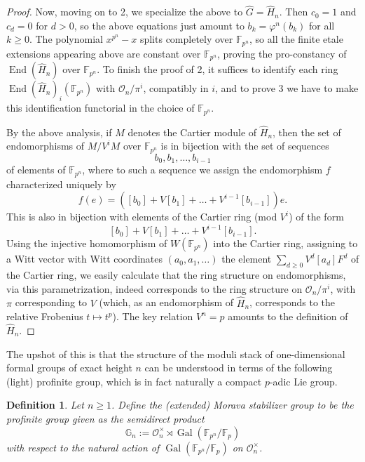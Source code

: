 \documentclass[12pt]{article}
\newtheorem{definition}[theorem]{Definition}
\newcommand{\on}{\operatorname}
\begin{document}
\begin{proof}
Now, moving on to 2, we specialize the above to $\widehat{G}=\widehat{H}_n$. Then $c_0=1$ and $c_d=0$ for $d>0$, so the above equations just amount to $b_k=\varphi^n(b_k)$ for all $k\geq 0$.  The polynomial $x^{p^n}-x$ splits completely over $\mathbb{F}_{p^n}$, so all the finite etale extensions appearing above are constant over $\mathbb{F}_{p^n}$, proving the pro-constancy of $\on{End}(\widehat{H}_n)$ over $\mathbb{F}_{p^n}$.  To finish the proof of 2, it suffices to identify each ring $\on{End}(\widehat{H}_n)_i(\mathbb{F}_{p^n})$ with $\mathcal{O}_n/\pi^i$, compatibly in $i$, and to prove 3 we have to make this identification functorial in the choice of $\mathbb{F}_{p^n}$.

By the above analysis, if $M$ denotes the Cartier module of $\widehat{H}_n$, then the set of endomorphisms of $M/V^i M$ over $\mathbb{F}_{p^n}$ is in bijection with the set of sequences
$$b_0,b_1,\ldots,b_{i-1}$$
of elements of $\mathbb{F}_{p^n}$, where to such a sequence we assign the endomorphism $f$ characterized uniquely by
$$f(e) = ([b_0] + V[b_1] + \ldots + V^{i-1}[b_{i-1}])e.$$
This is also in bijection with elements of the Cartier ring (mod $V^i$) of the form
$$[b_0] + V[b_1] + \ldots + V^{i-1}[b_{i-1}].$$
Using the injective homomorphism of $W(\mathbb{F}_{p^n})$ into the Cartier ring, assigning to a Witt vector with Witt coordinates $(a_0,a_1,\ldots)$ the element $\sum_{d\geq 0} V^d [a_d] F^d$ of the Cartier ring, we easily calculate that the ring structure on endomorphisms, via this parametrization, indeed corresponds to the ring structure on $\mathcal{O}_n/\pi^i$, with $\pi$ corresponding to $V$ (which, as an endomorphism of $\widehat{H}_n$, corresponds to the relative Frobenius $t\mapsto t^p$).  The key relation $V^n=p$ amounts to the definition of $\widehat{H}_n$.
\end{proof}

The upshot of this is that the structure of the moduli stack of one-dimensional formal groups of exact height $n$ can be understood in terms of the following (light) profinite group, which is in fact naturally a compact $p$-adic Lie group.

\begin{definition}\label{moravastab}
Let $n\geq 1$.  Define the \emph{(extended) Morava stabilizer group} to be the profinite group given as the semidirect product
$$\mathbb{G}_n:=\mathcal{O}_n^\times\rtimes \on{Gal}(\mathbb{F}_{p^n}/\mathbb{F}_p)$$
with respect to the natural action of $\on{Gal}(\mathbb{F}_{p^n}/\mathbb{F}_p)$ on $\mathcal{O}_n^\times$.
\end{definition}
\end{document}
